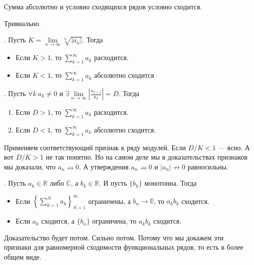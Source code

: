 \documentclass{article}
\begin{document}
\begin{itemize}
        \thm Сумма абсолютно и условно сходящихся рядов условно сходится.
        \begin{Proof}
            Тривиально.
        \end{Proof}
        \thm {}.
        Пусть $K=\overline{\lim\limits_{n\to\infty}}\sqrt[n]{|a_n|}$. Тогда
        \begin{itemize}
            \item Если $K>1$, то $\sum\limits_{k=1}^\infty a_k$ расходится.
            \item Если $K<1$, то $\sum\limits_{k=1}^\infty a_k$ абсолютно сходится
        \end{itemize}
        \thm {}. Пусть $\forall k~a_k\neq0$ и $\exists\lim\limits_{n\to\infty}\left|\frac{a_{k+1}}{a_k}\right|=D$. Тогда
        \begin{enumerate}
            \item Если $D>1$, то $\sum\limits_{k=1}^\infty a_k$ расходится.
            \item Если $D<1$, то $\sum\limits_{k=1}^\infty a_k$ абсолютно сходится.
        \end{enumerate}
        \begin{Proof}
            Применяем соответствующий признак к ряду модулей. Если $D/K<1$ --- ясно. А вот $D/K>1$ не так понятно. Но на самом деле мы в доказательствах признаков мы доказали, что $a_n\nrightarrow0$. А утверждения $a_n\nrightarrow0$ и $|a_n|\nrightarrow0$ равносильны.
        \end{Proof}
        \thm {}. Пусть $a_k\in\mathbb R$ либо $\mathbb C$, а $b_k\in\mathbb R$. И пусть $\{b_k\}$ монотонна. Тогда
        \begin{itemize}
            \item[\undercolor{darkgreen}{Дирихле}] Если $\left\{\sum\limits_{k=1}^N a_k\right\}_{N=1}^\infty$ ограничены, а $b_n\to\mathbb0$, то $a_kb_k$ сходится.
            \item[\undercolor{darkgreen}{Абель}] Если $a_k$ сходится, а $\{b_n\}$ ограничена, то $a_kb_k$ сходится.
        \end{itemize}
        \begin{Proof}
            Доказательство будет потом. Сильно потом. Потому что мы докажем эти признаки для равномерной сходимости функциональных рядов, то есть в более общем виде.
        \end{Proof}

\end{itemize}
\end{document}
